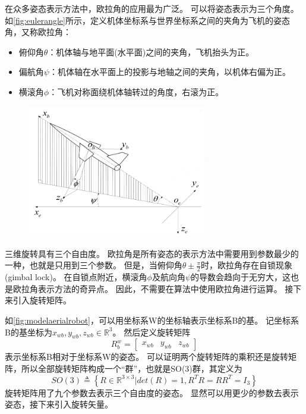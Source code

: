 \documentclass[
  type=master
]{gdutthesis}
\begin{document}
在众多姿态表示方法中，欧拉角的应用最为广泛\cite{stuelpnagel1964parametrization}。
可以将姿态表示为三个角度。
如\autoref{fig:eulerangle}所示，定义机体坐标系与世界坐标系之间的夹角为飞机的姿态角，又称欧拉角：
\begin{itemize}
	\item 俯仰角$\theta$：机体轴与地平面(水平面)之间的夹角，飞机抬头为正。
	\item 偏航角$\psi$：机体轴在水平面上的投影与地轴之间的夹角，以机体右偏为正。
	\item 横滚角$\phi$：飞机对称面绕机体轴转过的角度，右滚为正。
\end{itemize}
\begin{figure}[htbp]
	\centering
	\includegraphics[width=0.7\textwidth]{屏幕截图 2022-03-31 231147.png}
	\label{fig:eulerangle}
\end{figure}
三维旋转具有三个自由度。
欧拉角是所有姿态的表示方法中需要用到参数最少的一种，也就是只用到三个参数。
但是，当俯仰角$\theta \pm \frac{\pi}{2}$时，欧拉角存在自锁现象(gimbal lock)。
在自锁点附近，横滚角$\phi$及航向角$\psi$的导数会趋向于无穷大，这也是欧拉角表示方法的奇异点。
因此，不需要在算法中使用欧拉角进行运算。
接下来引入旋转矩阵。

如\autoref{fig:modelaerialrobot}，可以用坐标系W的坐标轴表示坐标系B的基。
记坐标系B的基坐标为$x_{wb}, y_{wb}, z_{wb} \in \mathbb{R}^3$。
然后定义旋转矩阵
\begin{equation}\label{eq:rotationmatrixdefinition}
R_b^w = 
\begin{bmatrix}
x_{wb} & y_{wb} & z_{wb}
\end{bmatrix}
\end{equation}
表示坐标系B相对于坐标系W的姿态。
可以证明两个旋转矩阵的乘积还是旋转矩阵，所以全部旋转矩阵构成一个“群”，也就是SO(3)群，其定义为
\begin{equation}\label{eq:so3}
SO(3) \triangleq \left\{ R \in \mathbb{R}^{3 \times 3} | det(R) = 1, R^T R = R R^T = I_3 \right\}
\end{equation}
旋转矩阵用了九个参数去表示三个自由度的姿态。
显然可以用更少的参数去表示姿态，接下来引入旋转矢量。
\end{document}
